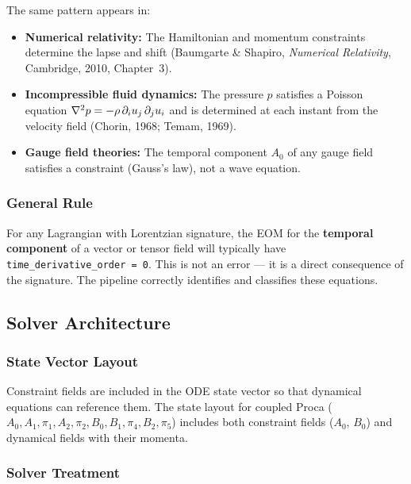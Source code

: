 The same pattern appears in:

\begin{itemize}
  \item \textbf{Numerical relativity:} The Hamiltonian and momentum constraints determine
    the lapse and shift (Baumgarte \& Shapiro, \emph{Numerical Relativity}, Cambridge,
    2010, Chapter~3).
  \item \textbf{Incompressible fluid dynamics:} The pressure $p$ satisfies a Poisson
    equation $\nabla^2 p = -\rho\,\partial_i u_j\,\partial_j u_i$ and is determined at each instant from
    the velocity field (Chorin, 1968; Temam, 1969).
  \item \textbf{Gauge field theories:} The temporal component $A_0$ of any gauge field
    satisfies a constraint (Gauss's law), not a wave equation.
\end{itemize}

\subsubsection{General Rule}
\label{sec:cf-general-rule}

For any Lagrangian with Lorentzian signature, the EOM for the \textbf{temporal
component} of a vector or tensor field will typically have
\texttt{time\_derivative\_order = 0}. This is not an error --- it is a direct consequence
of the signature. The pipeline correctly identifies and classifies these
equations.

\subsection{Solver Architecture}
\label{sec:cf-solver}

\subsubsection{State Vector Layout}
\label{sec:cf-state-layout}

Constraint fields are included in the ODE state vector so that dynamical
equations can reference them. The state layout for coupled Proca
($A_0, A_1, \pi_1, A_2, \pi_2, B_0, B_1, \pi_4, B_2, \pi_5$) includes both
constraint fields ($A_0$, $B_0$) and dynamical fields with their momenta.

\subsubsection{Solver Treatment}
\label{sec:cf-solver-treatment}

